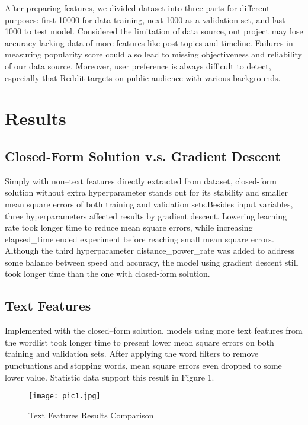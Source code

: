 \documentclass[12pt]{article}
\begin{document}
After preparing features, we divided dataset into three parts for different purposes: first 10000 for data training, next 1000 as a validation set, and last 1000 to test model. Considered the limitation of data source, out project may lose accuracy lacking data of more features like post topics and timeline. Failures in measuring popularity score could also lead to missing objectiveness and reliability of our data source. Moreover, user preference is always difficult to detect, especially that Reddit targets on public audience with various backgrounds.

\section*{Results}


\subsection*{Closed-Form Solution v.s. Gradient Descent}
Simply with non\---text features directly extracted from dataset, closed-form solution without extra hyperparameter stands out for its stability and smaller mean square errors of both training and validation sets.Besides input variables, three hyperparameters affected results by gradient descent. Lowering learning rate took longer time to reduce mean square errors, while increasing elapsed\_time ended experiment before reaching small mean square errors. Although the third hyperparameter distance\_power\_rate was added to address some balance between speed and accuracy, the model using gradient descent still took longer time than the one with closed-form solution.

\subsection*{Text Features}
Implemented with the closed\---form solution, models using more text features from the wordlist took longer time to present lower mean square errors on both training and validation sets. After applying the word filters to remove punctuations and stopping words, mean square errors even dropped to some lower value. Statistic data support this result in Figure 1.

\begin{figure}[h]
\centering
\texttt{[image: pic1.jpg]}
\caption{Text Features Results Comparison}
\label{fig: fig1}
\end{figure}
\end{document}
